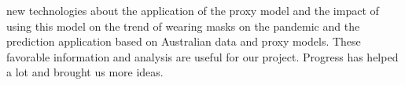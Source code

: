 new technologies about the application of the proxy model and the impact of using this model on the trend of wearing masks on the pandemic and the prediction application based on Australian data and proxy models. These favorable information and analysis are useful for our project. Progress has helped a lot and brought us more ideas.